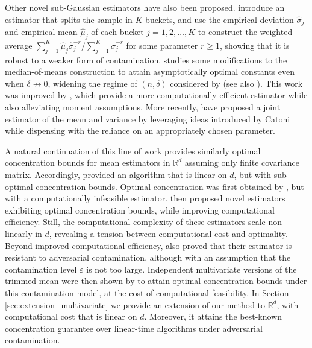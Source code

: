 \documentclass{article}
\theoremstyle{plain}
\theoremstyle{definition}
\def\R{\mathbb{R}} %
\begin{document}
Other novel sub-Gaussian estimators have also been proposed. \cite{minsker2021robust} introduce an estimator that splits the sample in $K$ buckets, and use the empirical deviation $\widehat{\sigma}_j$ and empirical mean $\widehat{\mu}_j$ of each bucket $j = 1,2,\dots, K$ to construct the weighted average $\sum_{j=1}^K \widehat{\mu}_j \widehat{\sigma}_j^{-r} / \sum_{j=1}^K \widehat{\sigma}_j^{-r}$ for some parameter $r \geq 1$, showing that it is robust to a weaker form of contamination.
\cite{minsker2023ustatistics} studies some modifications to the median-of-means construction to attain asymptotically optimal constants even when \( \delta \not\to 0 \), widening the regime of \( (n,\delta ) \) considered by \cite{lee2022optimal} (see also \cite{lecue2020robust}). This work was improved by \cite{minsker2023efficient}, which provide a more computationally efficient estimator while also alleviating moment assumptions. More recently, \cite{li2025jointrobustestimation} have proposed a joint estimator of the mean and variance by leveraging ideas introduced by Catoni while dispensing with the reliance on an appropriately chosen parameter.

A natural continuation of this line of work provides similarly optimal concentration bounds for mean estimators in \( \R^d \) assuming only finite covariance matrix. Accordingly, \cite{minsker2015geometric} provided an algorithm that is linear on $d$, but with sub-optimal concentration bounds. Optimal concentration was first obtained by \cite{lugosi2019vector}, but with a computationally infeasible estimator. \cite{hopkins2020, cherapanamjeri2019fast, depersin2022robust, mathieu2022concentration} then proposed novel estimators exhibiting optimal concentration bounds, while improving computational efficiency. Still, the computational complexity of these estimators scale non-linearly in $d$, revealing a tension between computational cost and optimality. Beyond improved computational efficiency, \cite{depersin2022robust} also proved that their estimator is resistant to adversarial contamination, although with an assumption that the contamination level \( \varepsilon  \) is not too large. Independent multivariate versions of the trimmed mean were then shown by \cite{lugosi2021, oliveira2025} to attain optimal concentration bounds under this contamination model, at the cost of computational feasibility.
In Section \ref{sec:extension_multivariate} we provide an extension of our method to $\R^d$, with computational cost that is linear on $d$. Moreover, it attains the best-known concentration guarantee over linear-time algorithms under adversarial contamination.
\end{document}
